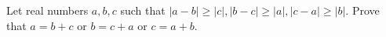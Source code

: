 Let real numbers  $a,b,c$ such that $\left| a-b \right|\ge \left| c \right|,\left| b-c \right|\ge \left| a \right|,\left| c-a \right|\ge \left| b \right|.$
Prove that $a=b+c$ or $b=c+a$ or $c=a+b.$